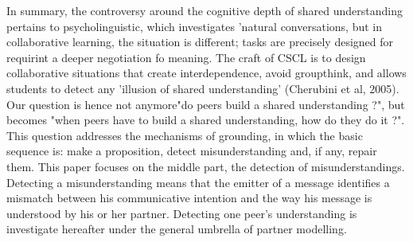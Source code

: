 \documentclass[natbib]{svjour3}
\begin{document}
%
%
%

\vspace{2em}

In summary, the controversy around the cognitive depth of shared understanding
pertains to psycholinguistic, which investigates 'natural conversations, but  in
collaborative learning, the situation is different; tasks are precisely designed
for requirint a deeper negotiation fo meaning.  The craft of CSCL is to design
collaborative situations that create interdependence, avoid groupthink, and
allows students to detect any 'illusion of shared understanding' (Cherubini et
al, 2005). Our question is hence not  anymore"do peers build a shared
understanding ?", but becomes "when peers have to build a shared understanding,
how do they do it ?".  This question addresses the mechanisms of grounding, in
which the basic sequence is: make a proposition, detect misunderstanding and, if
any, repair them.  This paper focuses on the middle part, the detection of
misunderstandings.  Detecting a misunderstanding means that the emitter of a
message identifies a mismatch between his communicative intention and the way
his message is understood by his or her partner. Detecting one peer's
understanding is investigate hereafter under the general umbrella of partner
modelling.
\end{document}
